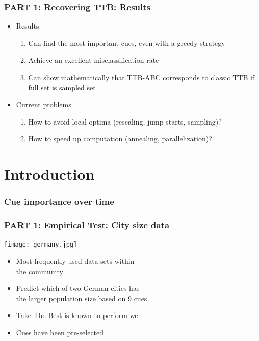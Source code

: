 \documentclass{beamer}
\begin{document}
\begin{frame}
 \frametitle{PART 1: Recovering TTB: Results}
\begin{itemize}
\item Results
\begin{enumerate}
\item Can find the most important cues, even with a greedy strategy
\item Achieve an excellent misclassification rate
\item Can show mathematically that TTB-ABC corresponds to classic TTB if full set is sampled set 
\end{enumerate}
\item Current problems
\begin{enumerate}
\item How to avoid local optima (rescaling, jump starts, sampling)?
\item How to speed up computation (annealing, parallelization)?
\end{enumerate}
\end{itemize}
\end{frame}


\section{Introduction}
\begin{frame}
   \frametitle{Cue importance over time}
   \begin{figure}
     \end{figure}
\end{frame}


\begin{frame}
 \frametitle{PART 1: Empirical Test: City size data}
\hfill \texttt{[image: germany.jpg]}\vspace{-3cm}
\begin{itemize}
\item Most frequently used data sets within\\ the community
\item Predict which of two German cities has\\ 
the larger population size based on 9 cues
\item Take-The-Best is known to perform well
\item Cues have been pre-selected
\end{itemize}
\end{frame}
\end{document}
